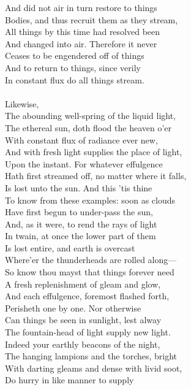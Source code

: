 And did not air in turn restore to things\\
Bodies, and thus recruit them as they stream,\\
All things by this time had resolved been\\
And changed into air. Therefore it never\\
Ceases to be engendered off of things\\
And to return to things, since verily\\
In constant flux do all things stream.\\
\\
Likewise,\\
The abounding well-spring of the liquid light,\\
The ethereal sun, doth flood the heaven o'er\\
With constant flux of radiance ever new,\\
And with fresh light supplies the place of light,\\
Upon the instant. For whatever effulgence\\
Hath first streamed off, no matter where it falls,\\
Is lost unto the sun. And this 'tis thine\\
To know from these examples: soon as clouds\\
Have first begun to under-pass the sun,\\
And, as it were, to rend the rays of light\\
In twain, at once the lower part of them\\
Is lost entire, and earth is overcast\\
Where'er the thunderheads are rolled along—\\
So know thou mayst that things forever need\\
A fresh replenishment of gleam and glow,\\
And each effulgence, foremost flashed forth,\\
Perisheth one by one. Nor otherwise\\
Can things be seen in sunlight, lest alway\\
The fountain-head of light supply new light.\\
Indeed your earthly beacons of the night,\\
The hanging lampions and the torches, bright\\
With darting gleams and dense with livid soot,\\
Do hurry in like manner to supply\\
